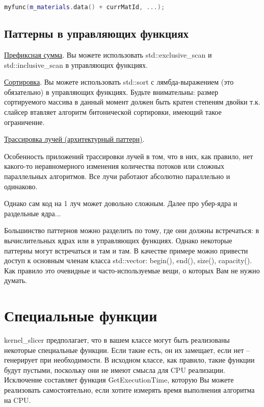 \documentclass[11pt,fleqn,english,russian]{report} %
\begin{document}
\begin{lstlisting}[language=C++, 
	caption=ограниченная поддержка арифметики указателей, 
	label=lst:addptr]
  myfunc(m_materials.data() + currMatId, ...);
\end{lstlisting}

\section{Паттерны в управляющих функциях}

\noindent\underline{Префиксная сумма}. Вы можете использовать std::exclusive\_scan и std::inclusive\_scan в управляющих функциях.

\noindent\underline{Сортировка}. Вы можете использовать std::sort с лямбда-выражением (это обязательно) в управляющих функциях. Будьте внимательны: размер сортируемого массива в данный момент должен быть кратен степеням двойки т.к. слайсер втавляет алгоритм битонической сортировки, имеющий такое ограничение.

\noindent\underline{Трассировка лучей (архитектурный паттерн)}.

Особенность приложений трассировки лучей в том, что в них, как правило, нет какого-то неравномерного изменения количества потоков или сложных параллельных алгоритмов. Все лучи работают абсолютно параллельно и одинаково.

Однако сам код на 1 луч может довольно сложным. Далее про убер-ядра и раздельные ядра... 

\begin{remark}
Большинство паттернов можно разделить по тому, где они должны встречаться: в вычислительных ядрах или в управляющих функциях. Однако некоторые паттерны могут встречаться и там и там. В качестве примере можно привести доступ к основным членам класса std::vector: begin(), end(), size(), capacity(). Как правило это очевидные и часто-используемые вещи, о которых Вам не нужно думать.
\end{remark}

\chapter{Специальные функции}\label{spec_functions}

kernel\_slicer предполагает, что в вашем классе могут быть реализованы некоторые специальные функции. Если такие есть, он их замещает, если нет -- генерирует при необходимости. В исходном классе, как правило, такие функции будут пустыми, поскольку они не имеют смысла для CPU реализации. Исключение составляет функция GetExecutionTime, которую Вы можете реализовать самостоятельно, если хотите измерять время выполнения алгоритма на CPU.
\end{document}
